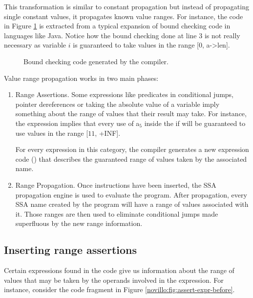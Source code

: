 This transformation is similar to constant propagation but
instead of propagating single constant values, it propagates
known value ranges.  For instance, the code in Figure
\ref{novillo:fig:vrp-1} is extracted from a typical expansion of
bound checking code in languages like Java. Notice how the bound
checking done at line 3 is not really necessary as variable $i$
is guaranteed to take values in the range [$0$, a->len].

\begin{figure}
    \centering
    \parbox{2in}{}
    \caption{Bound checking code generated by the compiler.}
    \label{novillo:fig:vrp-1}
\end{figure}

Value range propagation works in two main phases:

\begin{enumerate}
\item	Range Assertions.  Some expressions like predicates in
	conditional jumps, pointer dereferences or taking the
	absolute value of a variable imply something about the
	range of values that their result may take.  For
	instance, the expression 
	implies that every use of a$_5$ inside the if will be
	guaranteed to use values in the range [$11$, +INF].

	For every expression in this category, the compiler
	generates a new expression code ()
	that describes the guaranteed range of values taken by
	the associated name.

\item	Range Propagation.  Once  instructions
	have been inserted, the SSA propagation engine is used to
	evaluate the program.  After propagation, every SSA name
	created by the program will have a range of values
	associated with it.  Those ranges are then used to
	eliminate conditional jumps made superfluous by the new
	range information.
\end{enumerate}

\subsection{Inserting range assertions}

Certain expressions found in the code give us information about
the range of values that may be taken by the operands involved in
the expression.  For instance, consider the code fragment in
Figure \ref{novillo:fig:assert-expr-before}.


